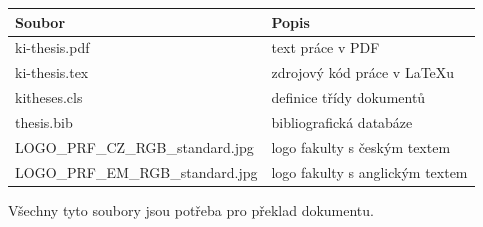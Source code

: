 \documentclass[male,czech,api_bc]{kitheses}
\newcommand{\SeznamPriloh}{}
\newif\ifInAppendixTable
\begin{document}
\InAppendixTabletrue

\begin{tabularx}{\textwidth}{>{\raggedright\arraybackslash}p{}>{\raggedleft\arraybackslash}X}
\toprule
Soubor & Popis \\
\midrule
ki-thesis.pdf & text práce v PDF \\
ki-thesis.tex & zdrojový kód práce v \LaTeX{}u \\
kitheses.cls & definice třídy dokumentů \\
thesis.bib & bibliografická databáze \\
LOGO\_PRF\_CZ\_RGB\_standard.jpg & logo fakulty s českým textem \\
LOGO\_PRF\_EM\_RGB\_standard.jpg & logo fakulty s anglickým textem \\
\SeznamPriloh
\bottomrule
\end{tabularx}

\InAppendixTablefalse 

Všechny tyto soubory jsou potřeba pro překlad dokumentu.
\end{document}

